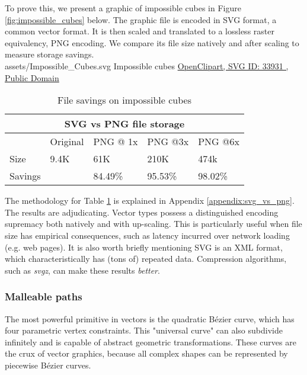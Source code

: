 To prove this, we present a graphic of impossible cubes in Figure \ref{fig:impossible_cubes} below. The graphic file is encoded in SVG format, a common vector format. It is then scaled and translated to a lossless raster equivalency, PNG encoding. We compare its file size natively and after scaling to measure storage savings.\\

\svg
{assets/Impossible_Cubes.svg}
{\label{fig:impossible_cubes}Impossible cubes}
{\href{https://freesvg.org/by/OpenClipart}{OpenClipart, SVG ID: 33931 , Public Domain}}

\clearpage

\begin{table}
\centering
\begin{tabular}{ |p{2cm}||p{2cm}|p{2cm}|p{2cm}|p{2cm}|  }
\hline
\multicolumn{5}{|c|}{SVG vs PNG file storage} \\
\hline
&Original&PNG @ 1x&PNG @3x&PNG @6x\\
\hline
Size&9.4K&61K&210K&474k\\
\hline
Savings&&84.49\%&95.53\%&98.02\%\\
\hline
\end{tabular}
\caption{\label{tab:impossible_cubes_stats}File savings on impossible cubes}
\end{table}

The methodology for Table \ref{tab:impossible_cubes_stats} is explained in Appendix \ref{appendix:svg_vs_png}. The results are adjudicating. Vector types possess a distinguished encoding supremacy both natively and with up-scaling. This is particularly useful when file size has empirical consequences, such as latency incurred over network loading (e.g. web pages). It is also worth briefly mentioning SVG is an XML format, which characteristically has (tons of) repeated data. Compression algorithms, such as \textit{svgz}, can make these results \emph{better}.\\

\subsubsection{Malleable paths}
The most powerful primitive in vectors is the quadratic Bézier curve, which has four parametric vertex constraints. This "universal curve" can also subdivide infinitely and is capable of abstract geometric transformations. These curves are the crux of vector graphics, because all complex shapes can be represented by piecewise Bézier curves.\\

